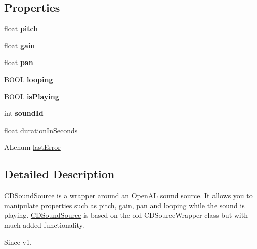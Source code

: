 \subsection*{Properties}
\begin{DoxyCompactItemize}
\item 
\mbox{\label{interfaceCDSoundSource_aa18363948940c0813dc99c21c3026fbd}} 
float {\bfseries pitch}
\item 
\mbox{\label{interfaceCDSoundSource_ad6af000c5bc05853db4d9aa39c7a4c21}} 
float {\bfseries gain}
\item 
\mbox{\label{interfaceCDSoundSource_a284dc619da74f09a9fe9e39f198d626b}} 
float {\bfseries pan}
\item 
\mbox{\label{interfaceCDSoundSource_a926cf544f910e23e59f71181272f6e4d}} 
B\+O\+OL {\bfseries looping}
\item 
\mbox{\label{interfaceCDSoundSource_abe7973e6b487094cedd5b5fac920cef2}} 
B\+O\+OL {\bfseries is\+Playing}
\item 
\mbox{\label{interfaceCDSoundSource_a226e9a094bafd48393e81d0c44a9a07a}} 
int {\bfseries sound\+Id}
\item 
float \hyperlink{interfaceCDSoundSource_a403933986316e6c2ecc5d7357cece956}{duration\+In\+Seconds}
\item 
A\+Lenum \hyperlink{interfaceCDSoundSource_aca348013aabdd95a2bb6aa837c7f74e9}{last\+Error}
\end{DoxyCompactItemize}


\subsection{Detailed Description}
\hyperlink{interfaceCDSoundSource}{C\+D\+Sound\+Source} is a wrapper around an Open\+AL sound source. It allows you to manipulate properties such as pitch, gain, pan and looping while the sound is playing. \hyperlink{interfaceCDSoundSource}{C\+D\+Sound\+Source} is based on the old C\+D\+Source\+Wrapper class but with much added functionality.

\begin{DoxySince}{Since}
v1. 
\end{DoxySince}



